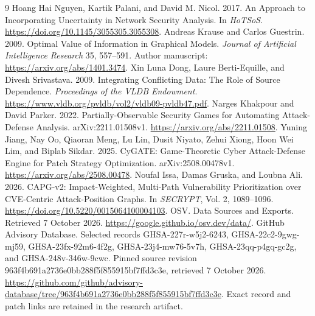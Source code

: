 \documentclass[manuscript,screen,nonacm]{acmart}
\begin{document}
\begin{thebibliography}{9}
 Hoang Hai Nguyen, Kartik Palani, and David M. Nicol. 2017. An Approach to Incorporating Uncertainty in Network Security Analysis. In \emph{HoTSoS}. \url{https://doi.org/10.1145/3055305.3055308}.
 Andreas Krause and Carlos Guestrin. 2009. Optimal Value of Information in Graphical Models. \emph{Journal of Artificial Intelligence Research} 35, 557--591. Author manuscript: \url{https://arxiv.org/abs/1401.3474}.
 Xin Luna Dong, Laure Berti-Equille, and Divesh Srivastava. 2009. Integrating Conflicting Data: The Role of Source Dependence. \emph{Proceedings of the VLDB Endowment}. \url{https://www.vldb.org/pvldb/vol2/vldb09-pvldb47.pdf}.
 Narges Khakpour and David Parker. 2022. Partially-Observable Security Games for Automating Attack-Defense Analysis. arXiv:2211.01508v1. \url{https://arxiv.org/abs/2211.01508}.
 Yuning Jiang, Nay Oo, Qiaoran Meng, Lu Lin, Dusit Niyato, Zehui Xiong, Hoon Wei Lim, and Biplab Sikdar. 2025. CyGATE: Game-Theoretic Cyber Attack-Defense Engine for Patch Strategy Optimization. arXiv:2508.00478v1. \url{https://arxiv.org/abs/2508.00478}.
 Noufal Issa, Damas Gruska, and Loubna Ali. 2026. CAPG-v2: Impact-Weighted, Multi-Path Vulnerability Prioritization over CVE-Centric Attack-Position Graphs. In \emph{SECRYPT}, Vol. 2, 1089--1096. \url{https://doi.org/10.5220/0015064100004103}.
 OSV. Data Sources and Exports. Retrieved 7 October 2026. \url{https://google.github.io/osv.dev/data/}.
 GitHub Advisory Database. Selected records GHSA-227r-w5j2-6243, GHSA-22c2-9gwg-mj59, GHSA-23fx-92m6-4f2g, GHSA-23j4-mw76-5v7h, GHSA-23qq-p4gq-gc2g, and GHSA-248v-346w-9cwc. Pinned source revision 963f4b691a2736e0bb288f5f855915bf7ffd3c3e, retrieved 7 October 2026. \url{https://github.com/github/advisory-database/tree/963f4b691a2736e0bb288f5f855915bf7ffd3c3e}. Exact record and patch links are retained in the research artifact.
\end{thebibliography}
\end{document}
